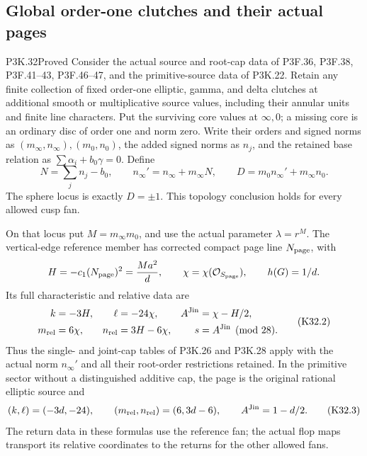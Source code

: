 \subsection{Global order-one clutches and their actual pages}

\begin{statement}{P3K.32}{Proved}
Consider the actual source and root-cap data of P3F.36, P3F.38,
P3F.41--43, P3F.46--47, and the primitive-source data of P3K.22.
Retain any finite collection of fixed order-one elliptic, gamma,
and delta clutches at additional smooth or multiplicative source
values, including their annular units and finite line characters.
Put the surviving core values at $\infty,0$; a missing core is
an ordinary disc of order one and norm zero. Write their orders
and signed norms as $(m_\infty,n_\infty),(m_0,n_0)$, the added
signed norms as $n_j$, and the retained base relation as
$\sum\alpha_i+b_0\gamma=0$. Define
\[
 N=\sum_jn_j-b_0,\qquad
 n_\infty'=n_\infty+m_\infty N,\qquad
 D=m_0n_\infty'+m_\infty n_0.                         \tag{K32.1}
\]
The sphere locus is exactly $D=\pm1$. This topology conclusion
holds for every allowed cusp fan.

On that locus put $M=m_\infty m_0$, and use the actual
parameter $\lambda=r^M$. The vertical-edge reference member
has corrected compact page line $N_{\rm page}$, with
\[
 H=-c_1(N_{\rm page})^2=\frac{Ma^2}{d},\qquad
 \chi=\chi(\mathcal O_{S_{\rm page}}),\qquad h(G)=1/d.
\]
Its full characteristic and relative data are
\[
 \begin{aligned}
 k&=-3H,&\ell&=-24\chi,& A^{\rm Jin}&=\chi-H/2,\\
 m_{\rm rel}&=6\chi,&n_{\rm rel}&=3H-6\chi,
 &s&=A^{\rm Jin}\pmod {28}.                           
 \end{aligned}\tag{K32.2}
\]
Thus the single- and joint-cap tables of P3K.26 and P3K.28
apply with the actual norm $n_\infty'$ and all their root-order
restrictions retained. In the primitive sector without a
distinguished additive cap, the page is the original rational
elliptic source and
\[
 (k,\ell)=(-3d,-24),\qquad
 (m_{\rm rel},n_{\rm rel})=(6,3d-6),\qquad
 A^{\rm Jin}=1-d/2.                                   \tag{K32.3}
\]
The return data in these formulas use the reference fan;
the actual flop maps transport its relative coordinates to
the returns for the other allowed fans.
\end{statement}

